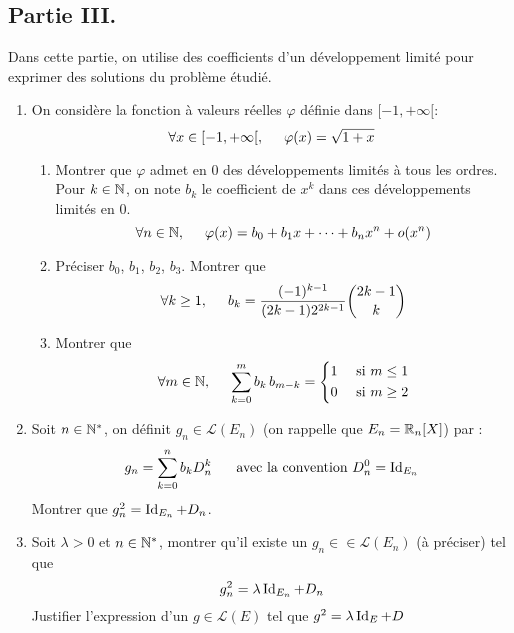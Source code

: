 \subsection*{Partie III.}
Dans cette partie, on utilise des coefficients d'un développement limité pour exprimer des solutions du problème étudié.
\begin{enumerate}
  \item On considère la fonction à valeurs réelles $\varphi$ définie dans $[-1, +\infty[$:
\begin{displaymath}
  \forall x \in [-1, +\infty[,\hspace{0.5cm} \varphi(x) = \sqrt{1+x}
\end{displaymath}
\begin{enumerate}
  \item Montrer que $\varphi$ admet en $0$ des développements limités à tous les ordres. Pour $k\in \mathbb{N}$, on note $b_k$ le coefficient de $x^k$ dans ces développements limités en $0$.
\begin{displaymath}
\forall n \in \mathbb{N}, \hspace{0.5cm}
\varphi(x) = b_0 + b_1x+\cdots +b_n x^n + o(x^n)
\end{displaymath}
\item Préciser $b_0$, $b_1$, $b_2$, $b_3$. Montrer que 
\begin{displaymath}
  \forall k \geq 1, \hspace{0.5cm} b_k=
\frac{(-1)^{k-1}}{(2k-1)2^{2k-1}}\binom{2k-1}{k}
\end{displaymath}

\item Montrer que 
\begin{displaymath}
\forall m \in\mathbb{N},\hspace{0.5cm}  \sum_{k=0}^{m}b_k\,b_{m-k}=
\left\lbrace 
\begin{aligned}
  &1 &\text{ si } m\leq 1 \\
  &0 &\text{ si } m\geq 2
\end{aligned}
\right. 
\end{displaymath}
\end{enumerate}

\item Soit $n\in \mathbb{N}^*$, on définit $g_n\in \mathcal{L}(E_n)$ (on rappelle que $E_n=\mathbb{R}_n[X]$) par :
\begin{displaymath}
  g_n = \sum_{k=0}^{n}b_k D_n^{k} \hspace{0.5cm} \text{ avec la convention } D_n^0 = \operatorname{Id}_{E_n}
\end{displaymath}
Montrer que $g_n^{2} = \operatorname{Id}_{E_n} + D_n$.

\item Soit $\lambda >0$ et $n\in \mathbb{N}^*$, montrer qu'il existe un $g_n\in \in \mathcal{L}(E_n)$ (à préciser) tel que 
\begin{displaymath}
  g_n^2 = \lambda \operatorname{Id}_{E_n} + D_n
\end{displaymath}
Justifier l'expression d'un $g\in \mathcal{L}(E)$ tel que $g^2 = \lambda \operatorname{Id}_{E} + D$
\end{enumerate}

